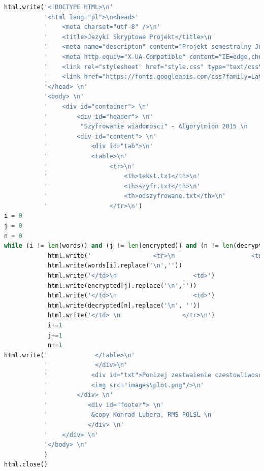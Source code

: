 \documentclass[12pt,a4paper]{article}
\begin{document}
\begin{itemize}
\begin{lstlisting}[language=Python]
html.write('<!DOCTYPE HTML>\n'
           '<html lang="pl">\n<head>'
           '    <meta charset="utf-8" />\n'
           '    <title>Jezyki Skryptowe Projekt</title>\n'
           '    <meta name="descripton" content="Projekt semestralny Jezyki Skryptowe Konrad Lubera"/>\n'
           '    <meta http-equiv="X-UA-Compatible" content="IE=edge,chrome=1"/> \n'
           '    <link rel="stylesheet" href="style.css" type="text/css" /> \n'
           '    <link href="https://fonts.googleapis.com/css?family=Lato&display=swap" rel="stylesheet"> \n'
           '</head> \n'
           '<body> \n'
           '    <div id="container"> \n'
           '        <div id="header"> \n'
           '         "Szyfrowanie wiadomosci" - Algorytmion 2015 \n         </div> \n'
           '        <div id="content"> \n'
           '            <div id="tab">\n'
           '            <table>\n'
           '                 <tr>\n'
           '                     <th>tekst.txt</th>\n'
           '                     <th>szyfr.txt</th>\n'
           '                     <th>odszyfrowane.txt</th>\n'
           '                 </tr>\n')
i = 0
j = 0
n = 0
while (i != len(words)) and (j != len(encrypted)) and (n != len(decrypted)):
            html.write('                 <tr>\n                     <td>')
            html.write(words[i].replace('\n',''))
            html.write('</td>\n                     <td>')
            html.write(encrypted[j].replace('\n',''))
            html.write('</td>\n                     <td>')
            html.write(decrypted[n].replace('\n', ''))
            html.write('</td> \n                 </tr>\n')
            i+=1
            j+=1
            n+=1
html.write('             </table>\n'
           '             </div>\n'
           '            <div id="txt">Ponizej zestwaienie czestowliwosci wystepowania danych systemow liczbowych </div> \n'
           '            <img src="images\plot.png"/>\n'           
           '        </div> \n'
           '           <div id="footer"> \n'
           '            &copy Konrad Lubera, RMS POLSL \n'
           '           </div> \n'
           '    </div> \n'
           '</body> \n'
           )
html.close()

	\end{lstlisting}
	

\end{itemize}
\end{document}
